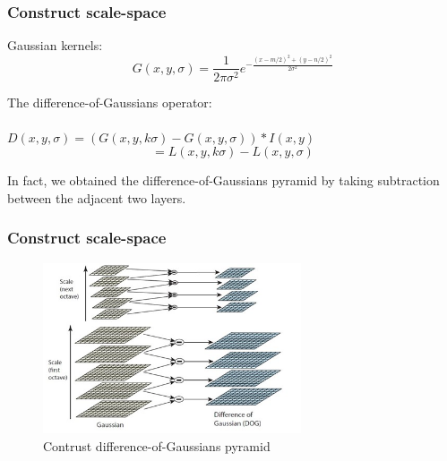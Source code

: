 \documentclass[notheorems, serif, table, compress]{beamer}  %
\begin{document}
\begin{frame}[fragile]
\frametitle{Construct scale-space}

Gaussian kernels:
\begin{equation}
G(x,y,\sigma)=\frac{1}{2\pi \sigma^{2}}e^{-\frac{(x-m/2)^{2}+(y-n/2)^{2}}{2\sigma^{2}}}
\end{equation}



The difference-of-Gaussians operator:%
\quad \\
\quad \\
$D(x,y,\sigma)=(G(x,y,k\sigma)-G(x,y,\sigma))*I(x,y)$
\begin{equation}
=L(x,y,k\sigma)-L(x,y,\sigma)
\end{equation}




In fact, we obtained the difference-of-Gaussians pyramid by taking subtraction between the adjacent two layers.

\end{frame}

\begin{frame}[fragile]
\frametitle{Construct scale-space}
\begin{figure}[!ht]
  \centering\includegraphics[width=3in]{dog.png}
  \caption{Contrust difference-of-Gaussians pyramid}
 \label{dog}
  \end{figure}


\end{frame}
\end{document}
